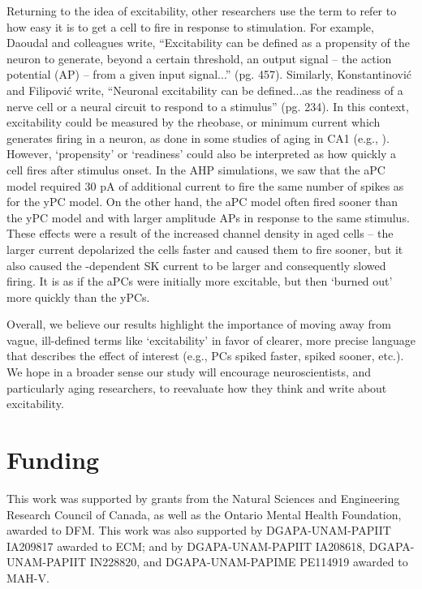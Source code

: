 \documentclass[12pt]{article}
\begin{document}
Returning to the idea of excitability, other researchers use the term to refer to how easy it is to get a cell to fire in response to stimulation. For example, Daoudal and colleagues \cite{daoudal2003long} write, ``Excitability can be defined as a propensity of the neuron to generate, beyond a certain threshold, an output signal -- the action potential (AP) -- from a given input signal...'' (pg. 457). Similarly, Konstantinovi{\'c} and Filipovi{\'c} \cite{konstantinovic2019effects} write, ``Neuronal excitability can be defined...as the readiness of a nerve cell or a neural circuit to respond to a stimulus'' (pg. 234). In this context, excitability could be measured by the rheobase, or minimum current which generates firing in a neuron, as done in some studies of aging in CA1 (e.g., \cite{potier1993age}). However, `propensity' or `readiness' could also be interpreted as how quickly a cell fires after stimulus onset. In the AHP simulations, we saw that the aPC model  required 30 pA of additional current to fire the same number of spikes as for the yPC model. On the other hand, the aPC model often fired sooner than the yPC model and with larger amplitude APs in response to the same stimulus. These effects were a result of the increased {\Ca} channel density in aged cells -- the larger {\Ca} current depolarized the cells faster and caused them to fire sooner, but it also caused the {\Ca}-dependent SK current to be larger and consequently slowed firing. It is as if the aPCs were initially more excitable, but then `burned out' more quickly than the yPCs. 

Overall, we believe our results highlight the importance of moving away from vague, ill-defined terms like `excitability' in favor of clearer, more precise language that describes the effect of interest (e.g., PCs spiked faster, spiked sooner, etc.). We hope in a broader sense our study will encourage neuroscientists, and particularly aging researchers, to reevaluate how they think and write about excitability.

\section*{Funding} 
This work was supported by grants from the Natural Sciences and Engineering Research Council of Canada, as well as the Ontario Mental Health Foundation, awarded to DFM. This work was also supported by DGAPA-UNAM-PAPIIT IA209817 awarded to ECM; and by DGAPA-UNAM-PAPIIT IA208618, DGAPA-UNAM-PAPIIT IN228820, and DGAPA-UNAM-PAPIME PE114919 awarded to MAH-V.   
 
 
\begin{small}


\end{small}
\end{document}

